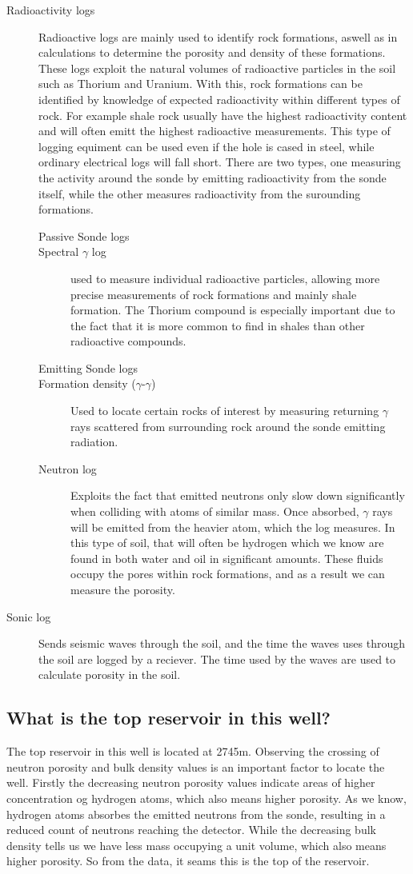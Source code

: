 \documentclass[a4paper,norsk]{article}
\begin{document}
\begin{description}
\item[Radioactivity logs] Radioactive logs are mainly used to identify rock formations, aswell as in calculations to determine the porosity and density of these formations. These logs exploit the natural volumes of radioactive particles in the soil such as Thorium and Uranium. With this, rock formations can be identified by knowledge of expected radioactivity within different types of rock. For example shale rock usually have the highest radioactivity content and will often emitt the highest radioactive measurements. This type of logging equiment can be used even if the hole is cased in steel, while ordinary electrical logs will fall short. There are two types, one measuring the activity around the sonde by emitting radioactivity from the sonde itself, while the other measures radioactivity from the surounding formations.  
	\begin{description}
	\item[Passive Sonde logs]
	\item[Spectral $\gamma$ log] used to measure individual radioactive particles, allowing more precise measurements of rock formations and mainly shale formation. The Thorium compound is especially important due to the fact that it is more common to find in shales than other radioactive compounds. 
	\item[Emitting Sonde logs]
	\item[Formation density ($\gamma$-$\gamma$)] Used to locate certain rocks of interest by measuring returning $\gamma$ rays scattered from surrounding rock around the sonde emitting radiation.
	\item[Neutron log] Exploits the fact that emitted neutrons only slow down significantly when colliding with atoms of similar mass. Once absorbed, $\gamma$ rays will be emitted from the heavier atom, which the log measures. In this type of soil, that will often be hydrogen which we know are found in both water and oil in significant amounts. These fluids occupy the pores within rock formations, and as a result we can measure the porosity.
	\end{description}
\item[Sonic log] Sends seismic waves through the soil, and the time the waves uses through the soil are logged by a reciever. The time used by the waves are used to calculate porosity in the soil.
\end{description}
\subsection*{What is the top reservoir in this well?}
The top reservoir in this well is located at 2745m. Observing the crossing of neutron porosity and bulk density values is an important factor to locate the well. Firstly the decreasing neutron porosity values indicate areas of higher concentration og hydrogen atoms, which also means higher porosity. As we know, hydrogen atoms absorbes the emitted neutrons from the sonde, resulting in a reduced count of neutrons reaching the detector. While the decreasing bulk density tells us we have less mass occupying a unit volume, which also means higher porosity. So from the data, it seams this is the top of the reservoir.
 
\end{document}
